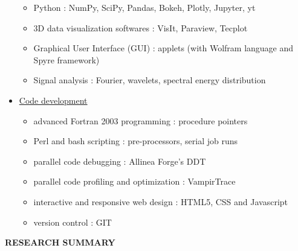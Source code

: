 \documentclass[11pt,onecolumn]{article}
\begin{document}
\begin{adjustwidth}{-0.5cm}{-0.5cm}
\begin{itemize}
\begin{itemize}[wide = 20pt]
\setlength{\itemindent}{-0.5em}
\item Python : NumPy, SciPy, Pandas, Bokeh, Plotly, Jupyter, yt
\item 3D data visualization softwares : VisIt, Paraview, Tecplot
\item Graphical User Interface (GUI) : applets (with Wolfram language and Spyre framework)
\item Signal analysis : Fourier, wavelets, spectral energy distribution
\end{itemize}
\item[] \underline{Code development}
\begin{itemize}[wide = 8pt]
\setlength\itemsep{-0.2em}
\setlength{\itemindent}{-0.5em}
\item advanced Fortran 2003 programming : procedure pointers
\item Perl and bash scripting : pre-processors, serial job runs
\item parallel code debugging : Allinea Forge's DDT
\item parallel code profiling and optimization : VampirTrace 
\item interactive and responsive web design : HTML5, CSS and Javascript
\item version control : GIT
\end{itemize}
\end{itemize}

\end{adjustwidth}

\newpage

\vspace*{-1.2cm}
\begin{center}
\Large \textbf{RESEARCH SUMMARY}\\
\end{center}
\normalfont
\end{document}
